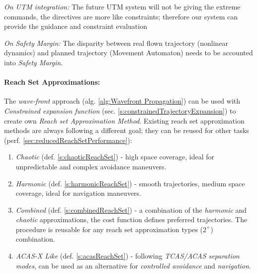 \begin{note}
    \emph{On UTM integration:} The future UTM system will not be giving the extreme commands, the directives are more like constraints; therefore our system can provide the guidance and constraint evaluation
\end{note}

\begin{note}
    \emph{On Safety Margin:} The disparity between real flown trajectory (nonlinear dynamics) and planned trajectory (Movement Automaton) needs to be accounted into \emph{Safety Margin}.
\end{note}

\paragraph{Reach Set Approximations:} The \emph{wave-front} approach (alg. \ref{alg:Wavefront Propagation}) can be used with \emph{Constrained expansion function} (sec. \ref{s:constrainedTrajectoryExpansion}) to create own \emph{Reach set Approximation Method}. Existing  reach set approximation methods are always following a different goal; they can be reused for other tasks (perf. \ref{sec:reducedReachSetPerformance}):

\begin{enumerate}
    \item \emph{Chaotic} (def. \ref{s:chaoticReachSet}) - high space coverage, ideal for unpredictable and complex avoidance maneuvers.
    
    \item \emph{Harmonic} (def. \ref{s:harmonicReachSet}) - smooth trajectories, medium space coverage, ideal for navigation maneuvers.
    
    \item \emph{Combined} (def. \ref{s:combinedReachSet}) - a combination of the \emph{harmonic} and \emph{chaotic} approximations, the cost function defines preferred trajectories. The procedure is reusable for any reach set approximation types ($2^+$) combination.
    
    \item \emph{ACAS-X Like} (def. \ref{s:acasReachSet}) - following \emph{TCAS/ACAS separation modes}, can be used as an alternative for \emph{controlled avoidance} and \emph{navigation}.
\end{enumerate}